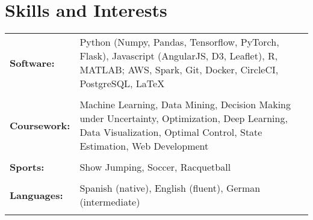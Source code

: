 \documentclass[a4paper,10pt]{article}
\begin{document}










\section{Skills and Interests}
\begin{tabularx}{\textwidth}{lX}
\bf{Software:}& Python (Numpy, Pandas, Tensorflow, PyTorch, Flask), Javascript (AngularJS, D3, Leaflet), R, MATLAB; AWS, Spark, Git, Docker, CircleCI, PostgreSQL, \LaTeX \\ \\ 

 \bf{Coursework:}& Machine Learning, Data Mining, Decision Making under Uncertainty, Optimization, Deep Learning, Data Visualization, Optimal Control, State Estimation, Web Development\\ \\ 

 \bf{Sports:}& Show Jumping, Soccer, Racquetball\\ \\

 \bf{Languages:}& Spanish (native), English (fluent), German (intermediate)\\ \\ 
\end{tabularx}

\nocite{*}


\end{document}
